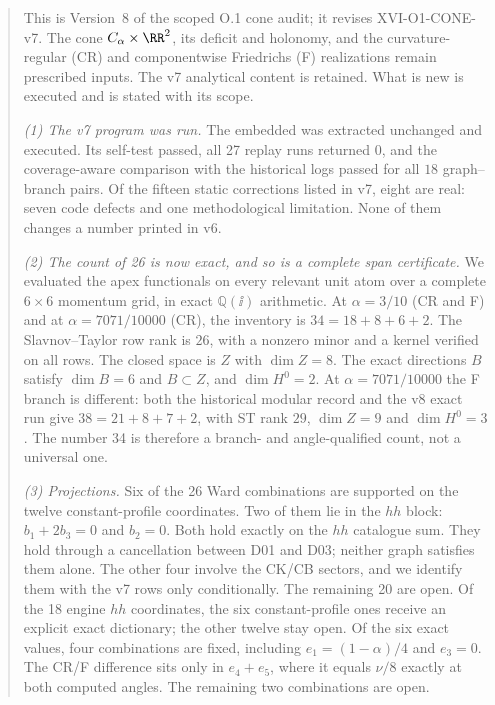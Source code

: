 \begin{abstract}
This is Version~8 of the scoped O.1 cone audit; it revises
XVI-O1-CONE-v7. The cone \(C_\alpha\times\RR^2\), its deficit and
holonomy, and the curvature-regular (CR) and componentwise
Friedrichs (F) realizations remain prescribed inputs.
The v7 analytical content is retained. What is new is executed
and is stated with its scope.

\emph{(1) The v7 program was run.} The embedded 
was extracted unchanged and executed. Its self-test passed, all
27 replay runs returned 0, and the coverage-aware comparison with
the historical logs passed for all \(18\) graph--branch pairs.
Of the fifteen static corrections listed in v7, eight are real:
seven code defects and one methodological limitation. None of them changes a number printed in v6.

\emph{(2) The count of 26 is now exact, and so is a complete span
certificate.} We evaluated the apex functionals on every
relevant unit atom over a complete \(6\times6\) momentum grid,
in exact \(\mathbb Q(\ii)\) arithmetic. At
\(\alpha=3/10\) (CR and F) and at \(\alpha=7071/10000\) (CR), the
inventory is \(34=18+8+6+2\). The Slavnov--Taylor row rank is
\(26\), with a nonzero minor and a kernel verified on all rows.
The closed space is \(Z\) with \(\dim Z=8\). The exact directions
\(B\) satisfy \(\dim B=6\) and \(B\subset Z\), and
\(\dim H^0=2\). At \(\alpha=7071/10000\) the F branch is different:
both the historical modular record and the v8 exact run give
\(38=21+8+7+2\), with ST rank \(29\), \(\dim Z=9\) and
\(\dim H^0=3\).
The number 34 is therefore a branch- and angle-qualified count,
not a universal one.

\emph{(3) Projections.} Six of the 26 Ward combinations are
supported on the twelve constant-profile coordinates.
Two of them lie in the \(hh\) block: \(b_1+2b_3=0\) and \(b_2=0\).
Both hold exactly on the \(hh\) catalogue sum. They hold through
a cancellation between D01 and D03; neither graph satisfies them
alone. The other four involve the CK/CB sectors, and we identify
them with the v7 rows only conditionally. The remaining 20 are
open.
Of the 18 engine \(hh\) coordinates, the six constant-profile
ones receive an explicit exact dictionary; the other twelve stay
open.
Of the six exact values, four combinations are fixed, including
\(e_1=(1-\alpha)/4\) and \(e_3=0\). The CR/F difference sits only
in \(e_4+e_5\), where it equals \(\nu/8\) exactly at both
computed angles. The remaining two
combinations are open.


\end{abstract}
